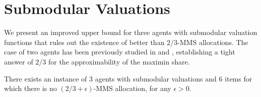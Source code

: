 \section{Submodular Valuations}
\label{sec:Submod}

We present an improved upper bound for three agents with submodular valuation functions that rules out the existence of better than $2/3$-MMS allocations. The case of two agents has been previously studied in \cite{KKM23} and \cite{ChristodoulouChristoforidis}, establishing a tight answer of $2/3$ for the approximability of the maximin share. 



\begin{theorem}
\label{thm:SubmodUB}
    There exists an instance of $3$ agents with submodular valuations and $6$ items for which there is no $(2/3+\epsilon)$-MMS allocation, for any $\epsilon>0$.
\end{theorem}

